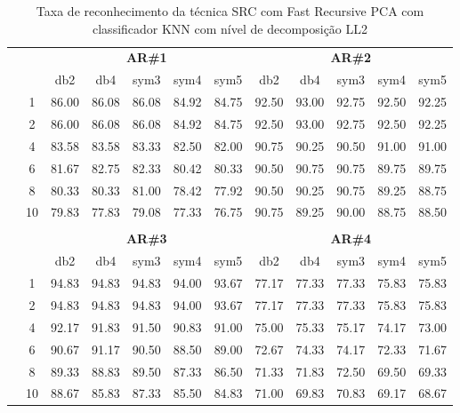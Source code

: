 \begin{table}[htpb]
	\centering
    \normalsize
	\caption{Taxa de reconhecimento da técnica SRC com Fast Recursive PCA com classificador KNN com nível de decomposição LL2}
	\begin{tabular}{|c|c|c c c c c|c c c c c|}
\cline{3-12}
\multicolumn{2}{c|}{\multirow{2}{*}{}} & \multicolumn{5}{c|}{\textbf{AR\#1}}  & \multicolumn{5}{c|}{\textbf{AR\#2}} \\\cline{3-12}

\multicolumn{2}{c|}{}  & db2 & db4 & sym3 & sym4 & sym5 & db2 & db4& sym3 & sym4 & sym5 \\\hline

\multicolumn{1}{|c|}{ \multirow{5}{*}{\rotatebox[origin=c]{90}{\textbf{K-vizinhos}}} }
&1	&86.00	&86.08	&86.08	&84.92	&84.75	&92.50	&93.00	&92.75	&92.50	&92.25\\\cline{2-12}
&2	&86.00	&86.08	&86.08	&84.92	&84.75	&92.50	&93.00	&92.75	&92.50	&92.25\\\cline{2-12}
&4	&83.58	&83.58	&83.33	&82.50	&82.00	&90.75	&90.25	&90.50	&91.00	&91.00\\\cline{2-12}
&6	&81.67	&82.75	&82.33	&80.42	&80.33	&90.50	&90.75	&90.75	&89.75	&89.75\\\cline{2-12}
&8	&80.33	&80.33	&81.00	&78.42	&77.92	&90.50	&90.25	&90.75	&89.25	&88.75\\\cline{2-12}
&10	&79.83	&77.83	&79.08	&77.33	&76.75	&90.75	&89.25	&90.00	&88.75	&88.50%

	
\\ \midrule
\multicolumn{12}{c}{}\\ 

\cline{3-12}
\multicolumn{2}{c}{} & \multicolumn{5}{|c|}{\textbf{AR\#3}}  & \multicolumn{5}{c|}{\textbf{AR\#4}} \\\cline{3-12}
\multicolumn{2}{c}{}  & \multicolumn{1}{|c}{db2} & db4 & sym3 & sym4 & sym5 & db2 & db4& sym3 & sym4 & sym5 \\\hline
\multicolumn{1}{|c|}{ \multirow{6}{*}{\rotatebox[origin=c]{90}{\textbf{K-vizinhos}}} }
&1	&94.83	&94.83	&94.83	&94.00	&93.67	&77.17	&77.33	&77.33	&75.83	&75.83\\\cline{2-12}
&2	&94.83	&94.83	&94.83	&94.00	&93.67	&77.17	&77.33	&77.33	&75.83	&75.83\\\cline{2-12}
&4	&92.17	&91.83	&91.50	&90.83	&91.00	&75.00	&75.33	&75.17	&74.17	&73.00\\\cline{2-12}
&6	&90.67	&91.17	&90.50	&88.50	&89.00	&72.67	&74.33	&74.17	&72.33	&71.67\\\cline{2-12}
&8	&89.33	&88.83	&89.50	&87.33	&86.50	&71.33	&71.83	&72.50	&69.50	&69.33\\\cline{2-12}
&10	&88.67	&85.83	&87.33	&85.50	&84.83	&71.00	&69.83	&70.83	&69.17	&68.67%

	

\\\midrule
\end{tabular}

\end{table}



